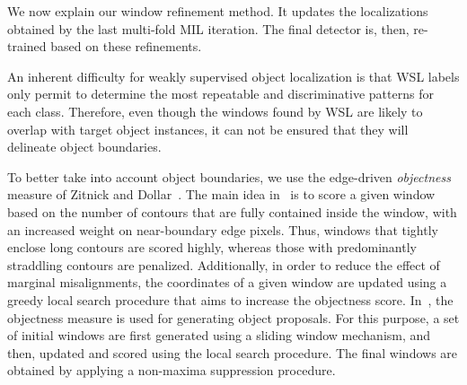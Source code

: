 \documentclass[10pt,journal,cspaper,final,twocolumn,compsoc]{./IEEEtran}
\begin{document}
We now explain our window refinement method. It updates the
localizations obtained by the last multi-fold MIL iteration. The final
detector is, then, re-trained based on these refinements.

An inherent difficulty for weakly supervised object localization is
that WSL labels only permit to determine the 
most repeatable and discriminative patterns for each
class.  Therefore, even though the windows found by WSL
are likely to overlap with target object instances, it can not be 
ensured that they will delineate object boundaries. 

To better take into account object boundaries, we use the
edge-driven {\em objectness} measure of Zitnick and
Dollar~\cite{zitnick14eccv}. The main idea in~\cite{zitnick14eccv} is to score a
given window based on the number of contours that are
fully contained inside the window, with an increased weight
on near-boundary edge pixels. Thus, windows that tightly
enclose long contours are scored highly, whereas those
with predominantly straddling contours are penalized. Additionally, in
order to reduce the effect of marginal misalignments, the coordinates
of a given window are updated using a greedy local search
procedure that aims to increase the objectness score.
In~\cite{zitnick14eccv}, the objectness measure is used
for generating object proposals. For this purpose, a set
of initial windows are first generated using a sliding window
mechanism, and then, updated and scored using
the local search procedure. The final windows
are obtained by applying a non-maxima suppression
procedure. 
\end{document}
